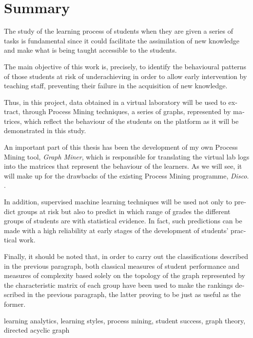 \chapter*{Summary}

\begin{otherlanguage}{english}

The study of the learning process of students when they are given a series of tasks is fundamental since it could facilitate the assimilation of new knowledge and make what is being taught accessible to the students.

The main objective of this work is, precisely, to identify the behavioural patterns of those students at risk of underachieving in order to allow early intervention by teaching staff, preventing their failure in the acquisition of new knowledge.

Thus, in this project, data obtained in a virtual laboratory will be used to extract, through Process Mining techniques, a series of graphs, represented by matrices, which reflect the behaviour of the students on the platform as it will be demonstrated in this study.

An important part of this thesis has been the development of my own Process Mining tool, \emph{Graph Miner}, which is responsible for translating the virtual lab logs into the matrices that represent the behaviour of the learners. As we will see, it will make up for the drawbacks of the existing Process Mining programme, \emph{Disco}. \cite{gunther2012disco}.

In addition, supervised machine learning techniques will be used not only to predict groups at risk but also to predict in which range of grades the different groups of students are with statistical evidence. In fact, such predictions can be made with a high reliability at early stages of the development of students' practical work.

Finally, it should be noted that, in order to carry out the classifications described in the previous paragraph, both classical measures of student performance and measures of complexity based solely on the topology of the graph represented by the characteristic matrix of each group have been used to make the rankings described in the previous paragraph, the latter proving to be just as useful as the former.

\small{ learning analytics, \; learning styles, \; process mining, \; student success, \; graph theory, \; directed acyclic graph}

\end{otherlanguage}